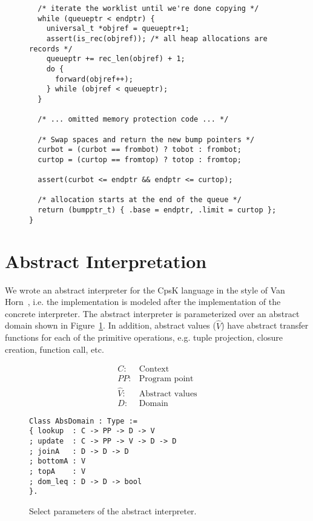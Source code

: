 \documentclass{article}
\begin{document}
\begin{figure}
\begin{lstlisting}
  /* iterate the worklist until we're done copying */
  while (queueptr < endptr) {
    universal_t *objref = queueptr+1;
    assert(is_rec(objref)); /* all heap allocations are records */
    queueptr += rec_len(objref) + 1;
    do {
      forward(objref++);
    } while (objref < queueptr);
  }

  /* ... omitted memory protection code ... */

  /* Swap spaces and return the new bump pointers */
  curbot = (curbot == frombot) ? tobot : frombot;
  curtop = (curtop == fromtop) ? totop : fromtop;

  assert(curbot <= endptr && endptr <= curtop);

  /* allocation starts at the end of the queue */
  return (bumpptr_t) { .base = endptr, .limit = curtop };
}
\end{lstlisting}
\end{figure}

\section{Abstract Interpretation}
\label{sec:abstract-interp}

We wrote an abstract interpreter for the CpsK language in the style of Van Horn~\cite{van2010abstracting}, i.e. the implementation is modeled after the implementation of the concrete interpreter. The abstract interpreter is parameterized over an abstract domain shown in Figure~\ref{fig:absinterp}. In addition, abstract values ($\hat{V}$) have abstract transfer functions for each of the primitive operations, e.g. tuple projection, closure creation, function call, etc.

\begin{figure}
\centering
\begin{minipage}[t]{.2\textwidth}
\begin{align*}
C: & \text{Context} \\
PP: & \text{Program point} \\
\hat{V}: & \text{Abstract values} \\
D: & \text{Domain}
\end{align*}
\end{minipage}
\hspace{20pt}
\begin{minipage}[t]{.43\textwidth}
\begin{lstlisting}
Class AbsDomain : Type :=
{ lookup  : C -> PP -> D -> V
; update  : C -> PP -> V -> D -> D
; joinA   : D -> D -> D
; bottomA : V 
; topA    : V 
; dom_leq : D -> D -> bool
}.
\end{lstlisting}
\end{minipage}
\caption{Select parameters of the abstract interpreter.}
\label{fig:absinterp}
\end{figure}
\end{document}
